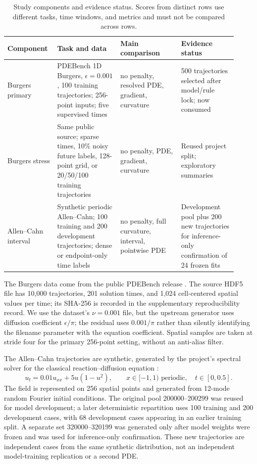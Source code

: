 \documentclass[a4paper,fleqn]{cas-sc}
\begin{document}
\begin{table}
\centering\small
\caption{Study components and evidence status. Scores from distinct rows use different tasks, time windows, and metrics and must not be compared across rows.}
\label{tab:design}
\setlength{\tabcolsep}{3pt}
\begin{tabular}{p{0.18\linewidth}p{0.26\linewidth}p{0.25\linewidth}p{0.23\linewidth}}
\toprule
Component & Task and data & Main comparison & Evidence status \\
\midrule
Burgers primary & PDEBench 1D Burgers, $\epsilon=0.001$, 100 training trajectories; 256-point inputs; five supervised times & no penalty, resolved PDE, gradient, curvature & 500 trajectories selected after model/rule lock; now consumed \\
Burgers stress & Same public source; sparse times, 10\% noisy future labels, 128-point grid, or 20/50/100 training trajectories & no penalty, PDE, gradient, curvature & Reused project split; exploratory summaries \\
Allen--Cahn interval & Synthetic periodic Allen--Cahn; 100 training and 200 development trajectories; dense or endpoint-only time labels & no penalty, full curvature, interval, pointwise PDE & Development pool plus 200 new trajectories for inference-only confirmation of 24 frozen fits \\
\bottomrule
\end{tabular}
\end{table}

The Burgers data come from the public PDEBench release \citep{takamoto2022pdebench}. The source HDF5 file has 10,000 trajectories, 201 solution times, and 1,024 cell-centered spatial values per time; its SHA-256 is recorded in the supplementary reproducibility record. We use the dataset's $\nu=0.001$ file, but the upstream generator uses diffusion coefficient $\epsilon/\pi$; the residual uses $0.001/\pi$ rather than silently identifying the filename parameter with the equation coefficient. Spatial samples are taken at stride four for the primary 256-point setting, without an anti-alias filter.

The Allen--Cahn trajectories are synthetic, generated by the project's spectral solver for the classical reaction--diffusion equation \citep{allen1979}:
\begin{equation}
  u_t = 0.01 u_{xx} + 5u(1-u^2), \qquad x\in[-1,1) \text{ periodic}, \quad t\in[0,0.5].
  \label{eq:allen}
\end{equation}
The field is represented on 256 spatial points and generated from 12-mode random Fourier initial conditions. The original pool 200000--200299 was reused for model development; a later deterministic repartition uses 100 training and 200 development cases, with 68 development cases appearing in an earlier training split. A separate set 320000--320199 was generated only after model weights were frozen and was used for inference-only confirmation. These new trajectories are independent cases from the same synthetic distribution, not an independent model-training replication or a second PDE.
\end{document}
